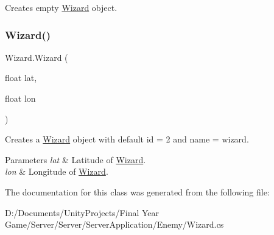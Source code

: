 Creates empty \mbox{\hyperlink{class_wizard}{Wizard}} object. 

\mbox{\label{class_wizard_adf1af8eec90b862b7456921d638f40ad}} 
\subsubsection{\texorpdfstring{Wizard()}{Wizard()}\hspace{0.1cm}{\footnotesize\ttfamily [2/2]}}
{\footnotesize\ttfamily Wizard.\+Wizard (\begin{DoxyParamCaption}\item[{float}]{lat,  }\item[{float}]{lon }\end{DoxyParamCaption})}



Creates a \mbox{\hyperlink{class_wizard}{Wizard}} object with default id = 2 and name = wizard. 


\begin{DoxyParams}{Parameters}
{\em lat} & Latitude of \mbox{\hyperlink{class_wizard}{Wizard}}.\\
\hline
{\em lon} & Longitude of \mbox{\hyperlink{class_wizard}{Wizard}}.\\
\hline
\end{DoxyParams}


The documentation for this class was generated from the following file\+:\begin{DoxyCompactItemize}
\item 
D\+:/\+Documents/\+Unity\+Projects/\+Final Year Game/\+Server/\+Server/\+Server\+Application/\+Enemy/Wizard.\+cs\end{DoxyCompactItemize}
